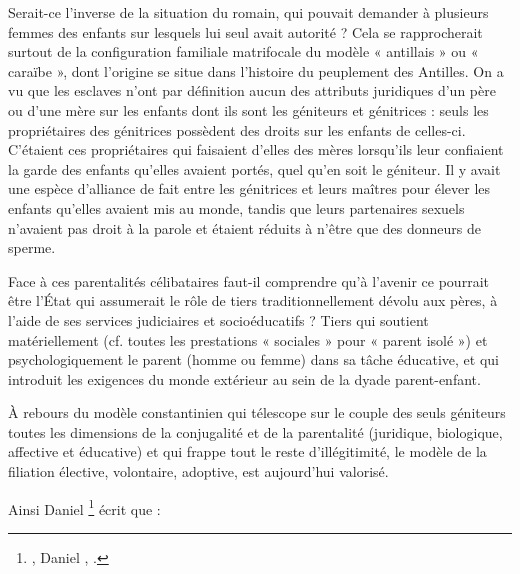  Serait-ce l'inverse de la situation du  romain, qui pouvait demander à plusieurs femmes des enfants sur lesquels lui seul avait autorité ? Cela se rapprocherait surtout de la configuration familiale matrifocale du modèle « antillais » ou « caraïbe », dont l'origine se situe dans l'histoire du peuplement des Antilles. On a vu que les esclaves n'ont par définition aucun des attributs juridiques d'un père ou d'une mère sur les enfants dont ils sont les géniteurs et génitrices : seuls les propriétaires des génitrices possèdent des droits sur les enfants de celles-ci. C'étaient ces propriétaires qui faisaient d'elles des mères lorsqu'ils leur confiaient la garde des enfants qu'elles avaient portés, quel qu'en soit le géniteur. Il y avait une espèce d'alliance de fait entre les génitrices et leurs maîtres pour élever les enfants qu'elles avaient mis au monde, tandis que leurs partenaires sexuels n'avaient pas droit à la parole et étaient réduits à n'être que des donneurs de sperme. 

 
 Face à ces parentalités célibataires faut-il comprendre qu'à l'avenir ce pourrait être l'État qui assumerait le rôle de tiers traditionnellement dévolu aux pères, à l'aide de ses services judiciaires et socioéducatifs ? Tiers qui soutient matériellement (cf. toutes les prestations « sociales » pour « parent isolé ») et psychologiquement le parent (homme ou femme) dans sa tâche éducative, et qui introduit les exigences du monde extérieur au sein de la dyade parent-enfant.
 
 À rebours du modèle constantinien qui télescope sur le couple des seuls géniteurs toutes les dimensions de la conjugalité et de la parentalité (juridique, biologique, affective et éducative) et qui frappe tout le reste d'illégitimité, le modèle de la filiation élective, volontaire, adoptive, est aujourd'hui valorisé. 
 
 Ainsi Daniel %
\footnote{\href{http://www.universalis.fr/encyclopedie/famille-les-enjeux-de-la-parentalite/}{}, Daniel , .} 
écrit que :

